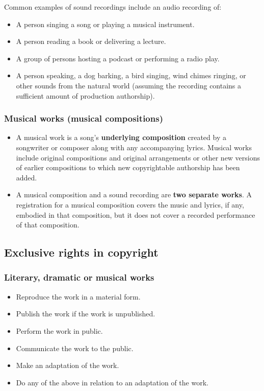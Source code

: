 \documentclass[11pt]{article}
\begin{document}
Common examples of sound recordings include an audio recording of:
\begin{itemize}
\item A person singing a song or playing a musical instrument.
\item A person reading a book or delivering a lecture.
\item A group of persons hosting a podcast or performing a radio play.
\item A person speaking, a dog barking, a bird singing, wind chimes ringing, or other sounds from the natural world (assuming the recording contains a sufficient amount of production authorship).
\end{itemize}

\subsubsection{Musical works (musical compositions)}
\label{sec:orgd07c175}
\begin{itemize}
\item A musical work is a song's \textbf{underlying composition} created by a songwriter or composer along with any accompanying lyrics. Musical works include original compositions and original arrangements or other new versions of earlier compositions to which new copyrightable authorship has been added.
\item A musical composition and a sound recording are \textbf{two separate works}. A registration for a musical composition covers the music and lyrics, if any, embodied in that composition, but it does not cover a recorded performance of that composition.
\end{itemize}

 \newpage

\subsection{Exclusive rights in copyright}
\label{sec:orga90ba04}

\subsubsection{Literary, dramatic or musical works}
\label{sec:org39f941a}
\begin{itemize}
\item Reproduce the work in a material form.
\item Publish the work if the work is unpublished.
\item Perform the work in public.
\item Communicate the work to the public.
\item Make an adaptation of the work.
\item Do any of the above in relation to an adaptation of the work.
\end{itemize}
\end{document}
